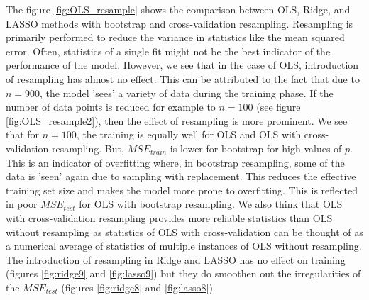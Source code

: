 The figure \ref{fig:OLS_resample} shows the comparison between OLS, Ridge, and LASSO methods with bootstrap and cross-validation resampling. Resampling is primarily performed to reduce the variance in statistics like the mean squared error. Often, statistics of a single fit might not be the best indicator of the performance of the model. However, we see that in the case of OLS, introduction of resampling has almost no effect. This can be attributed to the fact that due to $n = 900$, the model 'sees' a variety of data during the training phase. If the number of data points is reduced for example to $n=100$ (see figure \ref{fig:OLS_resample2}), then the effect of resampling is more prominent. We see that for $n=100$, the training is equally well for OLS and OLS with cross-validation resampling. But, $MSE_{train}$ is lower for bootstrap for high values of $p$. This is an indicator of overfitting where, in bootstrap resampling, some of the data is 'seen' again due to sampling with replacement. This reduces the effective training set size and makes the model more prone to overfitting. This is reflected in poor $MSE_{test}$ for OLS with bootstrap resampling. We also think that OLS with cross-validation resampling provides more reliable statistics than OLS without resampling as statistics of OLS with cross-validation can be thought of as a numerical average of statistics of multiple instances of OLS without resampling. The introduction of resampling in Ridge and LASSO has no effect on training (figures \ref{fig:ridge9} and \ref{fig:lasso9}) but they do smoothen out the irregularities of the $MSE_{test}$ (figures \ref{fig:ridge8} and \ref{fig:lasso8}).


